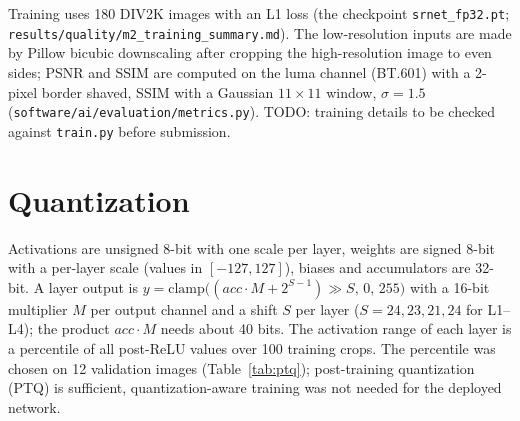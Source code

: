 \documentclass[conference]{IEEEtran}
\begin{document}
\begin{table}[t]
\caption{Layers of the network. Parameters include biases.}\label{tab:layers}
\centering
{}
\end{table}

Training uses 180 DIV2K images with an L1 loss (the checkpoint \texttt{srnet\_fp32.pt}; \texttt{results/\allowbreak{}quality/\allowbreak{}m2\_training\_summary.md}).
The low-resolution inputs are made by Pillow bicubic downscaling after cropping the high-resolution image to even sides; PSNR and SSIM are computed on the luma channel (BT.601)
with a 2-pixel border shaved, SSIM with a Gaussian $11\times11$ window, $\sigma=1.5$ (\texttt{software/\allowbreak{}ai/\allowbreak{}evaluation/\allowbreak{}metrics.py}).
TODO: training details to be checked against \texttt{train.py} before submission.

\section{Quantization}\label{sec:quant}
Activations are unsigned 8-bit with one scale per layer, weights are signed 8-bit with a per-layer scale (values in $[-127,127]$), biases and accumulators are 32-bit.
A layer output is $y=\mathrm{clamp}\big((acc\cdot M+2^{S-1})\gg S,\,0,\,255\big)$ with a 16-bit multiplier $M$ per output channel and a shift $S$ per layer
($S=24,23,21,24$ for L1--L4); the product $acc\cdot M$ needs about 40 bits.
The activation range of each layer is a percentile of all post-ReLU values over 100 training crops.
The percentile was chosen on 12 validation images (Table~\ref{tab:ptq}); post-training quantization (PTQ) is sufficient, quantization-aware training was not needed for the deployed network.
\end{document}

